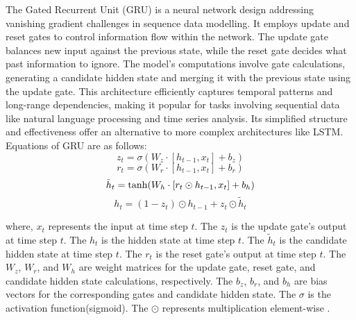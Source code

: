 The Gated Recurrent Unit (GRU) is a neural network design addressing vanishing gradient challenges in sequence data modelling. It employs update and reset gates to control information flow within the network. The update gate balances new input against the previous state, while the reset gate decides what past information to ignore. The model's computations involve gate calculations, generating a candidate hidden state and merging it with the previous state using the update gate. This architecture efficiently captures temporal patterns and long-range dependencies, making it popular for tasks involving sequential data like natural language processing and time series analysis. Its simplified structure and effectiveness offer an alternative to more complex architectures like LSTM. Equations of GRU are as follows:
\begin{equation}
z_t = \sigma(W_z \cdot [h_{t-1}, x_t] + b_z)
\end{equation}
\begin{equation}
r_t = \sigma(W_r \cdot [h_{t-1}, x_t] + b_r)
\end{equation}
\begin{equation}
\tilde{h}_t = \tanh(W_h \cdot [r_t \odot h_{t-1}, x_t] + b_h) \\
\end{equation}
\begin{equation}
h_t = (1 - z_t) \odot h_{t-1} + z_t \odot \tilde{h}_t
\end{equation}



where, \(x_t\) represents the input at time step \(t\). The
\(z_t\) is the update gate's output at time step \(t\). The
\(h_t\) is the hidden state at time step \(t\). The
\(\tilde{h}_t\) is the candidate hidden state at time step \(t\). The
\(r_t\) is the reset gate's output at time step \(t\). The
\(W_z\), \(W_r\), and \(W_h\) are weight matrices for the update gate, reset gate, and candidate hidden state calculations, respectively. The
\(b_z\), \(b_r\), and \(b_h\) are bias vectors for the corresponding gates and candidate hidden state. The
\(\sigma\) is the activation function(sigmoid). The
\(\odot\) represents multiplication element-wise .


